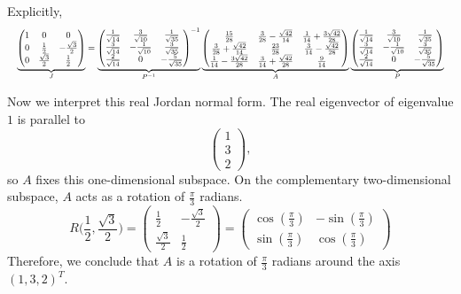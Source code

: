 \begin{example}
		Explicitly,
		\begin{equation}
			\resizebox{\textwidth}{!}{$
			\underbrace{\begin{pmatrix}
				1 & 0 & 0 \\
				0 & \frac{1}{2} & -\frac{\sqrt{3}}{2} \\
				0 & \frac{\sqrt{3}}{2} & \frac{1}{2}
			\end{pmatrix}}_{J}
			=
			\underbrace{\begin{pmatrix}
				\frac{1}{\sqrt{14}} & \frac{3}{\sqrt{10}} & \frac{1}{\sqrt{35}} \\
				\frac{3}{\sqrt{14}} & -\frac{1}{\sqrt{10}} & \frac{3}{\sqrt{35}} \\
				\frac{2}{\sqrt{14}} & 0 & -\frac{5}{\sqrt{35}}
			\end{pmatrix}^{-1}}_{P^{-1}}
			\underbrace{\begin{pmatrix}
				\frac{15}{28} & \frac{3}{28} - \frac{\sqrt{42}}{14} & \frac{1}{14} + \frac{3\sqrt{42}}{28} \\
				\frac{3}{28} + \frac{\sqrt{42}}{14} & \frac{23}{28} & \frac{3}{14} - \frac{\sqrt{42}}{28} \\
				\frac{1}{14} - \frac{3\sqrt{42}}{28} & \frac{3}{14} + \frac{\sqrt{42}}{28} & \frac{9}{14}
			\end{pmatrix}}_{A}
			\underbrace{\begin{pmatrix}
				\frac{1}{\sqrt{14}} & \frac{3}{\sqrt{10}} & \frac{1}{\sqrt{35}} \\
				\frac{3}{\sqrt{14}} & -\frac{1}{\sqrt{10}} & \frac{3}{\sqrt{35}} \\
				\frac{2}{\sqrt{14}} & 0 & -\frac{5}{\sqrt{35}}
			\end{pmatrix}}_{P}
			$}
		\end{equation}

		Now we interpret this real Jordan normal form. The real eigenvector of eigenvalue $1$ is parallel to
		\begin{equation}
			\begin{pmatrix}
				1 \\
				3 \\
				2
			\end{pmatrix},
		\end{equation}
		so $A$ fixes this one-dimensional subspace. On the complementary two-dimensional subspace, $A$ acts as a rotation of $\frac{\pi}{3}$ radians. 
		\begin{equation}
			R\bigg(\frac{1}{2}, \frac{\sqrt{3}}{2}\bigg) = \begin{pmatrix}
				\frac{1}{2} & -\frac{\sqrt{3}}{2} \\
				\frac{\sqrt{3}}{2} & \frac{1}{2}
			\end{pmatrix} = \begin{pmatrix}  
				\cos(\frac{\pi}{3}) & -\sin(\frac{\pi}{3}) \\ 
				\sin(\frac{\pi}{3}) & \cos(\frac{\pi}{3})
			\end{pmatrix}
		\end{equation}
		Therefore, we conclude that $A$ is a rotation of $\frac{\pi}{3}$ radians around the axis $(1, 3, 2)^T$. 


\end{example}

